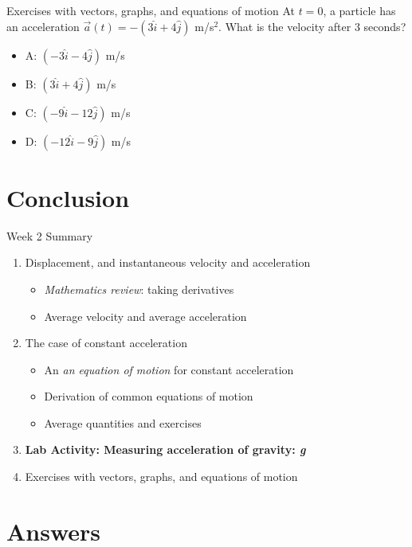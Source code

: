 \documentclass{beamer}
\begin{document}
\begin{frame}{Exercises with vectors, graphs, and equations of motion}
At $t=0$, a particle has an acceleration $\vec{a}(t) = -(3\hat{i}+4\hat{j})$ m/s$^2$.  What is the velocity after 3 seconds?\\
\begin{itemize}
\item A: $(-3\hat{i}-4\hat{j})$ m/s
\item B: $(3\hat{i}+4\hat{j})$ m/s
\item C: $(-9\hat{i}-12\hat{j})$ m/s
\item D: $(-12\hat{i}-9\hat{j})$ m/s
\end{itemize}
\end{frame}

\section{Conclusion}

\begin{frame}{Week 2 Summary}
\begin{enumerate}
\item Displacement, and instantaneous velocity and acceleration
\begin{itemize}
\item \textit{Mathematics review}: taking derivatives
\item Average velocity and average acceleration
\end{itemize}
\item The case of constant acceleration
\begin{itemize}
\item An \textit{an equation of motion} for constant acceleration
\item Derivation of \alert{common equations of motion}
\item Average quantities and exercises
\end{itemize}
\item \textbf{Lab Activity: Measuring acceleration of gravity: \textit{g}}
\item Exercises with vectors, graphs, and equations of motion
\end{enumerate}
\end{frame}

\section{Answers}
\end{document}
